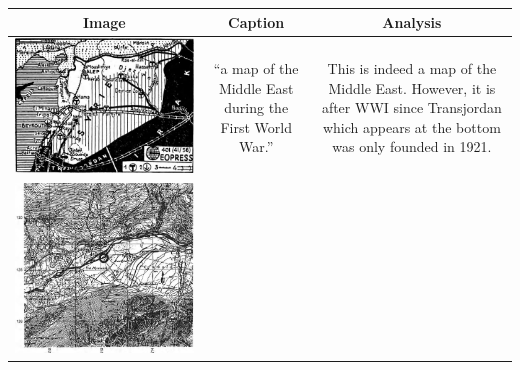 \begin{table}[h]
    \centering
    \begin{tabular}{c|c|c}
    \setlength{\tabcolsep}{5pt}
        \textbf{Image} & \textbf{Caption} & \textbf{Analysis}\\
        \hline
        \begin{minipage}[c]{4cm}
            \includegraphics[width=\linewidth]{Images/map1.png}
        \end{minipage} & 
        \begin{minipage}[c]{0.3\linewidth}
            “a map of the Middle East during the First World War.”
        \end{minipage} & 
        \begin{minipage}[c]{0.3\linewidth}
            This is indeed a map of the Middle East. However, it is after WWI since Transjordan which appears at the bottom was only founded in 1921.
        \end{minipage} \\
        \hline
        \begin{minipage}[c]{4cm}
            \includegraphics[width=\linewidth]{Images/map5.png}

\end{minipage}
\end{tabular}
\end{table}
